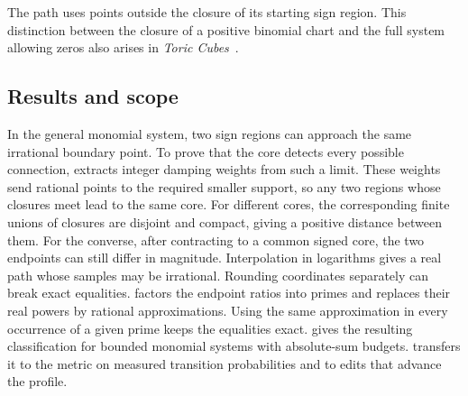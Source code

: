 The path uses points outside the closure of its starting sign region.
This distinction between the closure of a positive binomial chart and
the full system allowing zeros also arises in \emph{Toric
Cubes}~\citep[Example~3]{toriccubes}.

\subsection{Results and scope}

In the general monomial system, two sign regions can approach the same
irrational boundary point. To prove that the core detects every possible
connection,  extracts integer damping weights
from such a limit. These weights send rational points to the required
smaller support, so any two regions whose closures meet lead to the same
core. For different cores, the corresponding finite unions of closures
are disjoint and compact, giving a positive distance between them.
For the converse, after contracting to a common signed core, the two
endpoints can still differ in magnitude. Interpolation in logarithms
gives a real path whose samples may be irrational. Rounding coordinates
separately can break exact equalities.  factors
the endpoint ratios into primes and replaces their real powers by rational
approximations. Using the same approximation in every occurrence
of a given prime keeps the equalities exact. 
gives the resulting classification for bounded
monomial systems with absolute-sum budgets.  transfers
it to the metric on measured transition probabilities and to edits
that advance the profile.
